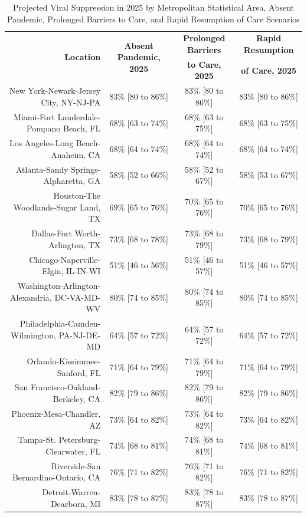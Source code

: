 \documentclass{article}
\begin{document}
\begin{table}[H]
	\caption{Projected Viral Suppression in 2025 by Metropolitan Statistical Area, Absent Pandemic, Prolonged Barriers to Care, and Rapid Resumption of Care Scenarios}
	\footnotesize
	\begin{tabular}{|r|c|c|c|}
		\hline
		\multirow{2}{*}{\textbf{Location}} & \multirow{2}{*}{\textbf{Absent Pandemic, 2025}} & \textbf{Prolonged Barriers} & \textbf{Rapid Resumption}\\
		&  & \textbf{to Care, 2025} & \textbf{of Care, 2025}\\
		\hline\hline
		New York-Newark-Jersey City, NY-NJ-PA & 83\% [80 to 86\%] & 83\% [80 to 86\%] & 83\% [80 to 86\%]\\
		Miami-Fort Lauderdale-Pompano Beach, FL & 68\% [63 to 74\%] & 68\% [63 to 75\%] & 68\% [63 to 75\%]\\
		Los Angeles-Long Beach-Anaheim, CA & 68\% [64 to 74\%] & 68\% [64 to 74\%] & 68\% [64 to 74\%]\\
		Atlanta-Sandy Springs-Alpharetta, GA & 58\% [52 to 66\%] & 58\% [52 to 67\%] & 58\% [53 to 67\%]\\
		Houston-The Woodlands-Sugar Land, TX & 69\% [65 to 76\%] & 70\% [65 to 76\%] & 70\% [65 to 76\%]\\
		Dallas-Fort Worth-Arlington, TX & 73\% [68 to 78\%] & 73\% [68 to 79\%] & 73\% [68 to 79\%]\\
		Chicago-Naperville-Elgin, IL-IN-WI & 51\% [46 to 56\%] & 51\% [46 to 57\%] & 51\% [46 to 57\%]\\
		Washington-Arlington-Alexandria, DC-VA-MD-WV & 80\% [74 to 85\%] & 80\% [74 to 85\%] & 80\% [74 to 85\%]\\
		Philadelphia-Camden-Wilmington, PA-NJ-DE-MD & 64\% [57 to 72\%] & 64\% [57 to 72\%] & 64\% [57 to 72\%]\\
		Orlando-Kissimmee-Sanford, FL & 71\% [64 to 79\%] & 71\% [64 to 79\%] & 71\% [64 to 79\%]\\
		San Francisco-Oakland-Berkeley, CA & 82\% [79 to 86\%] & 82\% [79 to 86\%] & 82\% [79 to 86\%]\\
		Phoenix-Mesa-Chandler, AZ & 73\% [64 to 82\%] & 73\% [64 to 82\%] & 73\% [64 to 82\%]\\
		Tampa-St. Petersburg-Clearwater, FL & 74\% [68 to 81\%] & 74\% [68 to 81\%] & 74\% [68 to 81\%]\\
		Riverside-San Bernardino-Ontario, CA & 76\% [71 to 82\%] & 76\% [71 to 82\%] & 76\% [71 to 82\%]\\
		Detroit-Warren-Dearborn, MI & 83\% [78 to 87\%] & 83\% [78 to 87\%] & 83\% [78 to 87\%]\\

\end{tabular}
\end{table}
\end{document}
